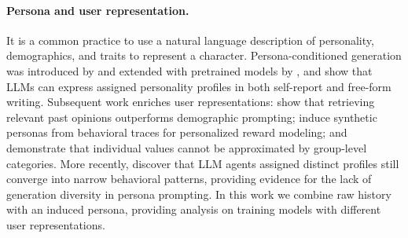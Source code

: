 \documentclass[11pt]{article}
\begin{document}
\paragraph{Persona and user representation.}
It is a common practice to use a natural language description of personality, demographics, and traits to represent a character. Persona-conditioned generation was introduced by \citet{zhang2018personalizing} and extended with pretrained models by \citet{wolf2019transfertransfo}, and \citet{jiang2024personallm} show that LLMs can express assigned personality profiles in both self-report and free-form writing. Subsequent work enriches user representations: \citet{hwang2023aligning} show that retrieving relevant past opinions outperforms demographic prompting; \citet{ryan2025synthesizeme} induce synthetic personas from behavioral traces for personalized reward modeling; and \citet{jiang2024indievalue} demonstrate that individual values cannot be approximated by group-level categories. More recently, \citet{xiao2026chameleon} discover that LLM agents assigned distinct profiles still converge into narrow behavioral patterns, providing evidence for the lack of generation diversity in persona prompting. In this work we combine raw history with an induced persona, providing analysis on training models with different user representations.
\end{document}
